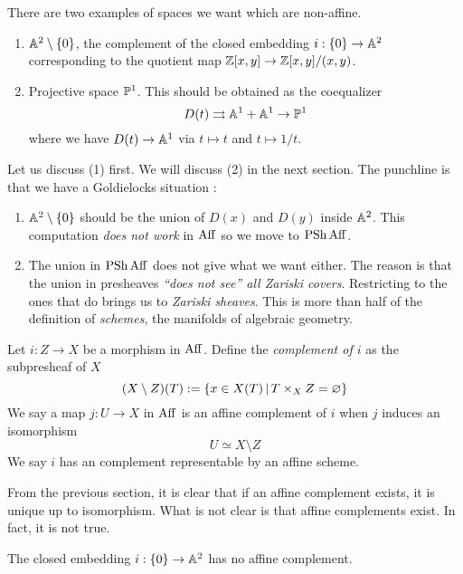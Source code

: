 \documentclass[./main.tex]{subfiles}
\begin{document}
There are two examples of spaces we want which are non-affine.
\begin{enumerate}
  \item $\mathbb{A}^2 \setminus \left\{0\right\}$, the complement of 
  the closed embedding $i : \left\{0\right\} \to \mathbb{A}^2$
  corresponding to the quotient map
  $\mathbb{Z}[x , y] \to \mathbb{Z}[x , y] / (x , y)$.
  \item Projective space $\mathbb{P}^1$.
  This should be obtained as the coequalizer 
  \[
    D(t) \rightrightarrows \mathbb{A}^1 + \mathbb{A}^1 \to \mathbb{P}^1  
  \]
  where we have $D(t) \to \mathbb{A}^1$ via $t \mapsto t$ and $t \mapsto 1 / t$.
\end{enumerate}
Let us discuss (1) first.
We will discuss (2) in the next section.
The punchline is that we have a Goldielocks situation : 
\begin{enumerate}
  \item $\mathbb{A}^2 \setminus \left\{0\right\}$ should be
  the union of $D(x)$ and $D(y)$ inside $\mathbb{A}^2$.
  This computation \emph{does not work} in $\mathrm{Aff}$ so we move to $\operatorname{PSh} \mathrm{Aff}$.
  \item The union in $\operatorname{PSh} \mathrm{Aff}$ does not give what we want either.
  The reason is that the union in presheaves \emph{``does not see'' all 
  Zariski covers}.
  Restricting to the ones that do brings us to \emph{Zariski sheaves}.
  This is more than half of the definition of \emph{schemes},
  the manifolds of algebraic geometry.
\end{enumerate}
\begin{dfn}[Complements]
  
  Let $i : Z \to X$ be a morphism in $\mathrm{Aff}$.
  Define the \emph{complement of $i$} as the subpresheaf of $X$
  \[
    (X \setminus Z) (T) := 
    \left\{x \in X(T) \,|\, T \times_X Z = \varnothing\right\}
  \]
  We say a map $j : U \to X$ in $\mathrm{Aff}$
  is an affine complement of $i$ when 
  $j$ induces an isomorphism \[
    U \simeq X \setminus Z  
  \]
  We say $i$ has an complement representable by an affine scheme.
\end{dfn}
From the previous section,
it is clear that if an affine complement exists, 
it is unique up to isomorphism.
What is not clear is that affine complements exist.
In fact, it is not true.
\begin{prop}
  
  The closed embedding $i : \left\{0\right\} \to \mathbb{A}^2$ has no affine complement.
\end{prop}
\end{document}
